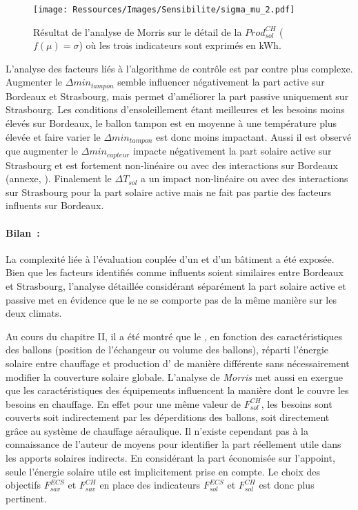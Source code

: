 \begin{figure}
    \centering
    \texttt{[image: Ressources/Images/Sensibilite/sigma\_mu\_2.pdf]}
    \caption[Résultat de l’analyse de Morris sur le détail de la
             $Prod_{sol}^{CH}$ ($f(\mu) = \sigma$)]
            {Résultat de l’analyse de Morris sur le détail de la
             $Prod_{sol}^{CH}$ ($f(\mu) = \sigma$) où les trois indicateurs sont exprimés
             en \si{kWh}.}
    \label{fig:prod_sol_chauffage_mu}
\end{figure}

L’analyse des facteurs liés à l’algorithme de contrôle est par contre plus complexe.
Augmenter le $\Delta min_{tampon}$ semble influencer négativement la part active sur
Bordeaux et Strasbourg, mais permet d’améliorer la part passive uniquement sur
Strasbourg. Les conditions d’ensoleillement étant meilleures et les besoins moins
élevés sur Bordeaux, le ballon tampon est en moyenne à une température plus élevée et
faire varier le $\Delta min_{tampon}$ est donc moins impactant. Aussi il est observé que
augmenter le $\Delta min_{capteur}$ impacte négativement la part solaire active sur
Strasbourg et est fortement non-linéaire ou avec des interactions sur Bordeaux (annexe,
). Finalement le $\Delta T_{sol}$ a un impact
non-linéaire ou avec des interactions sur Strasbourg pour la part solaire active mais ne fait
pas partie des facteurs influents sur Bordeaux.

\paragraph{Bilan~:} %
\label{par:bilan_prod_sol_chauff}
La complexité liée à l’évaluation couplée d’un  et d’un bâtiment a été exposée.
Bien que les facteurs identifiés comme influents soient similaires entre Bordeaux et
Strasbourg, l’analyse détaillée considérant séparément la part solaire active et passive
met en évidence que le  ne se comporte pas de la même manière sur les deux
climats.

Au cours du chapitre II, il a été montré que le , en fonction des
caractéristiques des ballons (position de l’échangeur ou volume des ballons), réparti
l’énergie solaire entre chauffage et production d’ de manière différente sans
nécessairement modifier la couverture solaire globale. L’analyse de \textit{Morris} met
aussi en exergue que les caractéristiques des équipements influencent la manière dont le
 couvre les besoins en chauffage. En effet pour une même valeur de $F_{sol}^{CH}$,
les besoins sont couverts soit indirectement par les déperditions des ballons, soit directement
grâce au système de chauffage aéraulique. Il n’existe cependant pas à la connaissance de l’auteur
de moyens pour identifier la part réellement utile dans les apports solaires indirects. En considérant
la part économisée sur l’appoint, seule l’énergie solaire utile est implicitement prise en
compte. Le choix des objectifs $F_{sav}^{ECS}$ et $F_{sav}^{CH}$ en place des indicateurs
$F_{sol}^{ECS}$ et $F_{sol}^{CH}$ est donc plus pertinent.

